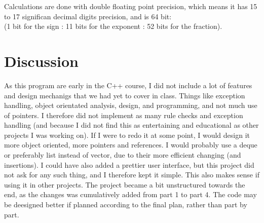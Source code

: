 \documentclass{article}
\begin{document}
			Calculations are done with double floating point precision, which means it has 15 to 17 significan decimal digits precision, and is 64 bit: \\
			(1 bit for the sign : 11 bits for the exponent : 52 bits for the fraction). \cite{doubleArithmetic} \cite{wikiDouble}
	
	
	\section{Discussion}
		As this program are early in the C++ course, I did not include a lot of features and design mechanigs that we had yet to cover in class. Things like exception handling, object orientated analysis, design, and programming, and not much use of pointers.
		I therefore did not implement as many rule checks and exception handling (and because I did not find this as entertaining and educational as other projects I was working on). If I were to redo it at some point, I would design it more object oriented, more pointers and references. I would probably use a deque or preferably list instead of vector, due to their more efficient changing (and insertions).
		I could have also added a prettier user interface, but this project did not ask for any such thing, and I therefore kept it simple. This also makes sense if using it in other projects.
		The project became a bit unstructured towards the end, as the changes was cumulatively added from part 1 to part 4. The code may be deesigned better if planned according to the final plan, rather than part by part.
	
	
	\clearpage
	
	
	
\end{document}
